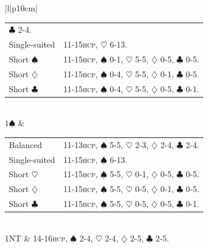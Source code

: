 \documentclass[a4paper,article,oneside]{memoir}
\newcommand{\hcp}{\textsc{hcp}}
\begin{document}
\begin{longtable}{|l|p{10cm}|}
\begin{tabular}{p{2.7cm}p{6cm}}
                               $\clubsuit$ 2-4. \\
                      Single-suited & 11-15\hcp,
                               $\heartsuit$ 6-13. \\
                      Short $\spadesuit$ & 11-15\hcp,
                               $\spadesuit$ 0-1,
                               $\heartsuit$ 5-5,
                               $\diamondsuit$ 0-5,
                               $\clubsuit$ 0-5. \\
                      Short $\diamondsuit$ & 11-15\hcp,
                               $\spadesuit$ 0-4,
                               $\heartsuit$ 5-5,
                               $\diamondsuit$ 0-1,
                               $\clubsuit$ 0-5. \\
                      Short $\clubsuit$ & 11-15\hcp,
                               $\spadesuit$ 0-4,
                               $\heartsuit$ 5-5,
                               $\diamondsuit$ 0-5,
                               $\clubsuit$ 0-1. \\
                  \end{tabular} \\
  \hline
  $1\spadesuit$ & \begin{tabular}{p{2.7cm}p{8cm}}
                      Balanced & 11-13\hcp,
                               $\spadesuit$ 5-5,
                               $\heartsuit$ 2-3,
                               $\diamondsuit$ 2-4,
                               $\clubsuit$ 2-4. \\
                      Single-suited & 11-15\hcp,
                               $\spadesuit$ 6-13. \\
                      Short $\heartsuit$ & 11-15\hcp,
                               $\spadesuit$ 5-5,
                               $\heartsuit$ 0-1,
                               $\diamondsuit$ 0-5,
                               $\clubsuit$ 0-5. \\
                      Short $\diamondsuit$ & 11-15\hcp,
                               $\spadesuit$ 5-5,
                               $\heartsuit$ 0-5,
                               $\diamondsuit$ 0-1,
                               $\clubsuit$ 0-5. \\
                      Short $\clubsuit$ & 11-15\hcp,
                               $\spadesuit$ 5-5,
                               $\heartsuit$ 0-5,
                               $\diamondsuit$ 0-5,
                               $\clubsuit$ 0-1. \\
                  \end{tabular} \\
  \hline
  1NT & 14-16\hcp, $\spadesuit$ 2-4, $\heartsuit$ 2-4,
        $\diamondsuit$ 2-5, $\clubsuit$ 2-5.


\end{longtable}
\end{document}
